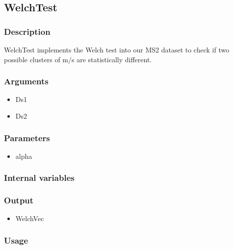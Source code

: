 \subsection{WelchTest}
\subsubsection{Description}

WelchTest implements the Welch test into our MS2 dataset to check if two possible clusters of m/s are statistically different.
\subsubsection{Arguments}
\begin{itemize}
\item Ds1
\item Ds2
\end{itemize}
\subsubsection{Parameters}
\begin{itemize}
\item alpha
\end{itemize}
\subsubsection{Internal variables}
\subsubsection{Output}
\begin{itemize}
\item WelchVec
\end{itemize}
\subsubsection{Usage}
